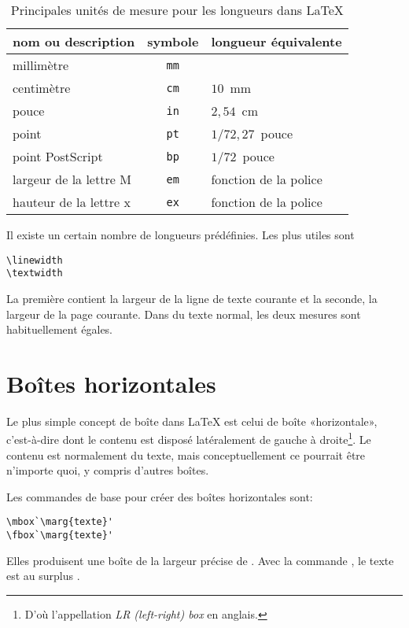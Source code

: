 \begin{table}
  \caption{Principales unités de mesure pour les longueurs dans
    {\LaTeX}}
  \label{tab:boites:longueurs}
  \centering
  \begin{tabular}{lcl}
    \toprule
    nom ou description & symbole & longueur équivalente \\
    \midrule
    millimètre & \texttt{mm} \\
    centimètre & \texttt{cm} & $10$~mm \\
    pouce      & \texttt{in} & $2,54$~cm \\
    point      & \texttt{pt} & $1/72,27$~pouce \\
    point PostScript     & \texttt{bp}   & $1/72$~pouce \\
    largeur de la lettre M & \texttt{em} & fonction de la police \\
    hauteur de la lettre x & \texttt{ex} & fonction de la police \\
    \bottomrule
  \end{tabular}
\end{table}

Il existe un certain nombre de longueurs prédéfinies. Les plus utiles sont
\begin{lstlisting}
\linewidth
\textwidth
\end{lstlisting}
La première contient la largeur de la ligne de texte courante et la
seconde, la largeur de la page courante. Dans du texte normal, les
deux mesures sont habituellement égales.



\section{Boîtes horizontales}
\label{sec:boites:lrbox}

Le plus simple concept de boîte dans {\LaTeX} est celui de boîte
«horizontale», c'est-à-dire dont le contenu est disposé latéralement
de gauche à droite\footnote{%
  D'où l'appellation \emph{LR (left-right) box} en anglais.}. %
Le contenu est normalement du texte, mais conceptuellement ce pourrait
être n'importe quoi, y compris d'autres boîtes.

Les commandes de base pour créer des boîtes horizontales sont:
\begin{lstlisting}
\mbox`\marg{texte}'
\fbox`\marg{texte}'
\end{lstlisting}
Elles produisent une boîte de la largeur précise de . Avec
la commande \cmd{\fbox}, le texte est au surplus .

